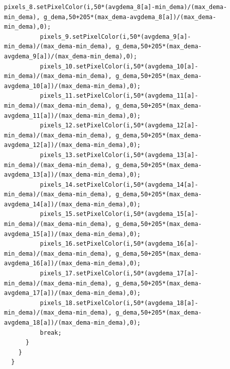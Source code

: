 \documentclass[a4paper,9pt]{article}
\begin{document}
\begin{lstlisting}[basicstyle=\tiny,style=CStyle]
          pixels_8.setPixelColor(i,50*(avgdema_8[a]-min_dema)/(max_dema-min_dema), g_dema,50+205*(max_dema-avgdema_8[a])/(max_dema-min_dema),0);
          pixels_9.setPixelColor(i,50*(avgdema_9[a]-min_dema)/(max_dema-min_dema), g_dema,50+205*(max_dema-avgdema_9[a])/(max_dema-min_dema),0);
          pixels_10.setPixelColor(i,50*(avgdema_10[a]-min_dema)/(max_dema-min_dema), g_dema,50+205*(max_dema-avgdema_10[a])/(max_dema-min_dema),0);
          pixels_11.setPixelColor(i,50*(avgdema_11[a]-min_dema)/(max_dema-min_dema), g_dema,50+205*(max_dema-avgdema_11[a])/(max_dema-min_dema),0);
          pixels_12.setPixelColor(i,50*(avgdema_12[a]-min_dema)/(max_dema-min_dema), g_dema,50+205*(max_dema-avgdema_12[a])/(max_dema-min_dema),0);
          pixels_13.setPixelColor(i,50*(avgdema_13[a]-min_dema)/(max_dema-min_dema), g_dema,50+205*(max_dema-avgdema_13[a])/(max_dema-min_dema),0);
          pixels_14.setPixelColor(i,50*(avgdema_14[a]-min_dema)/(max_dema-min_dema), g_dema,50+205*(max_dema-avgdema_14[a])/(max_dema-min_dema),0);
          pixels_15.setPixelColor(i,50*(avgdema_15[a]-min_dema)/(max_dema-min_dema), g_dema,50+205*(max_dema-avgdema_15[a])/(max_dema-min_dema),0);
          pixels_16.setPixelColor(i,50*(avgdema_16[a]-min_dema)/(max_dema-min_dema), g_dema,50+205*(max_dema-avgdema_16[a])/(max_dema-min_dema),0);
          pixels_17.setPixelColor(i,50*(avgdema_17[a]-min_dema)/(max_dema-min_dema), g_dema,50+205*(max_dema-avgdema_17[a])/(max_dema-min_dema),0);
          pixels_18.setPixelColor(i,50*(avgdema_18[a]-min_dema)/(max_dema-min_dema), g_dema,50+205*(max_dema-avgdema_18[a])/(max_dema-min_dema),0);
          break;
      }
    }
  }


\end{lstlisting}
\end{document}
